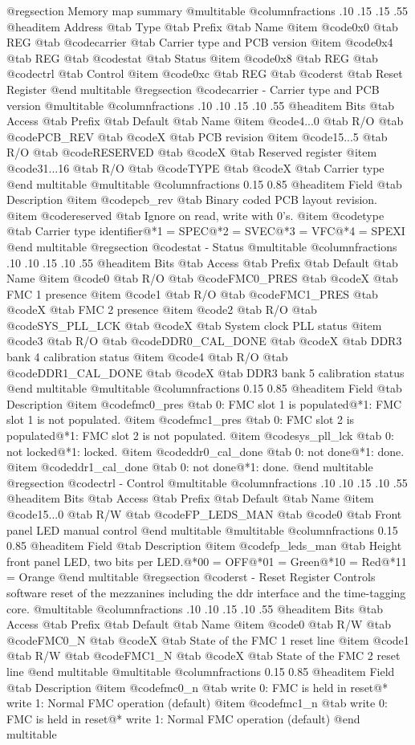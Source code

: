@regsection Memory map summary
@multitable  @columnfractions .10 .15 .15 .55
@headitem Address @tab Type @tab Prefix @tab Name
@item @code{0x0} @tab
REG @tab
@code{carrier} @tab
Carrier type and PCB version
@item @code{0x4} @tab
REG @tab
@code{stat} @tab
Status
@item @code{0x8} @tab
REG @tab
@code{ctrl} @tab
Control
@item @code{0xc} @tab
REG @tab
@code{rst} @tab
Reset Register
@end multitable 
@regsection @code{carrier} - Carrier type and PCB version
@multitable @columnfractions .10 .10 .15 .10 .55
@headitem Bits @tab Access @tab Prefix @tab Default @tab Name
@item @code{4...0}
@tab R/O @tab
@code{PCB_REV}
@tab @code{X} @tab 
PCB revision
@item @code{15...5}
@tab R/O @tab
@code{RESERVED}
@tab @code{X} @tab 
Reserved register
@item @code{31...16}
@tab R/O @tab
@code{TYPE}
@tab @code{X} @tab 
Carrier type
@end multitable
@multitable @columnfractions 0.15 0.85
@headitem Field @tab Description
@item @code{pcb_rev} @tab Binary coded PCB layout revision.
@item @code{reserved} @tab Ignore on read, write with 0's.
@item @code{type} @tab Carrier type identifier@*1 = SPEC@*2 = SVEC@*3 = VFC@*4 = SPEXI
@end multitable
@regsection @code{stat} - Status
@multitable @columnfractions .10 .10 .15 .10 .55
@headitem Bits @tab Access @tab Prefix @tab Default @tab Name
@item @code{0}
@tab R/O @tab
@code{FMC0_PRES}
@tab @code{X} @tab 
FMC 1 presence
@item @code{1}
@tab R/O @tab
@code{FMC1_PRES}
@tab @code{X} @tab 
FMC 2 presence
@item @code{2}
@tab R/O @tab
@code{SYS_PLL_LCK}
@tab @code{X} @tab 
System clock PLL status
@item @code{3}
@tab R/O @tab
@code{DDR0_CAL_DONE}
@tab @code{X} @tab 
DDR3 bank 4 calibration status
@item @code{4}
@tab R/O @tab
@code{DDR1_CAL_DONE}
@tab @code{X} @tab 
DDR3 bank 5 calibration status
@end multitable
@multitable @columnfractions 0.15 0.85
@headitem Field @tab Description
@item @code{fmc0_pres} @tab 0: FMC slot 1 is populated@*1: FMC slot 1 is not populated.
@item @code{fmc1_pres} @tab 0: FMC slot 2 is populated@*1: FMC slot 2 is not populated.
@item @code{sys_pll_lck} @tab 0: not locked@*1: locked.
@item @code{ddr0_cal_done} @tab 0: not done@*1: done.
@item @code{ddr1_cal_done} @tab 0: not done@*1: done.
@end multitable
@regsection @code{ctrl} - Control
@multitable @columnfractions .10 .10 .15 .10 .55
@headitem Bits @tab Access @tab Prefix @tab Default @tab Name
@item @code{15...0}
@tab R/W @tab
@code{FP_LEDS_MAN}
@tab @code{0} @tab 
Front panel LED manual control
@end multitable
@multitable @columnfractions 0.15 0.85
@headitem Field @tab Description
@item @code{fp_leds_man} @tab Height front panel LED, two bits per LED.@*00 = OFF@*01 = Green@*10 = Red@*11 = Orange
@end multitable
@regsection @code{rst} - Reset Register
Controls software reset of the mezzanines including the ddr interface and the time-tagging core.
@multitable @columnfractions .10 .10 .15 .10 .55
@headitem Bits @tab Access @tab Prefix @tab Default @tab Name
@item @code{0}
@tab R/W @tab
@code{FMC0_N}
@tab @code{X} @tab 
State of the FMC 1 reset line
@item @code{1}
@tab R/W @tab
@code{FMC1_N}
@tab @code{X} @tab 
State of the FMC 2 reset line
@end multitable
@multitable @columnfractions 0.15 0.85
@headitem Field @tab Description
@item @code{fmc0_n} @tab write 0: FMC is held in reset@* write 1: Normal FMC operation (default)
@item @code{fmc1_n} @tab write 0: FMC is held in reset@* write 1: Normal FMC operation (default)
@end multitable
